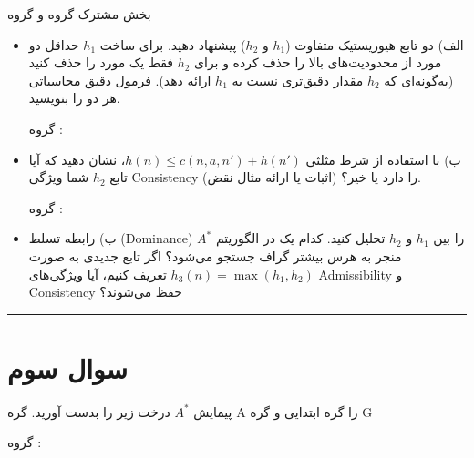 \documentclass[a4paper,10pt]{article}
\newcommand{\GroupA}{\noindent \textcolor{AccentGold}{گروه \lr{a}}}
\newcommand{\GroupB}{\noindent\textcolor{AccentCyan}{گروه \lr{b}}}
\begin{document}
بخش مشترک \GroupA و \GroupB
\begin{itemize}
\item الف)
دو تابع هیوریستیک متفاوت ($h_1$ و $h_2$) پیشنهاد دهید. برای ساخت $h_1$ حداقل دو مورد از محدودیت‌های بالا را حذف کرده و برای $h_2$ فقط یک مورد را حذف کنید (به‌گونه‌ای که $h_2$ مقدار دقیق‌تری نسبت به $h_1$ ارائه دهد). فرمول دقیق محاسباتی هر دو را بنویسید.

\GroupA:
\item ب)
با استفاده از شرط مثلثی $h(n) \le c(n, a, n') + h(n')$، نشان دهید که آیا تابع $h_2$ شما ویژگی Consistency را دارد یا خیر؟ (اثبات یا ارائه مثال نقض).

\GroupB:
\item ب)
رابطه تسلط (Dominance) را بین $h_1$ و $h_2$ تحلیل کنید. کدام یک در الگوریتم $A^*$ منجر به هرس بیشتر گراف جستجو می‌شود؟ اگر تابع جدیدی به صورت $h_3(n) = \max(h_1, h_2)$ تعریف کنیم، آیا ویژگی‌های Admissibility و Consistency حفظ می‌شوند؟

\end{itemize}
\bigskip
\textcolor{AccentCyan}{\rule{\linewidth}{0.4pt}}
\section{\textcolor{AccentGold}{سوال سوم}}
پیمایش 
$A^*$
درخت زیر را بدست آورید. گره A را گره ابتدایی و گره G 

\GroupA:
\end{document}
